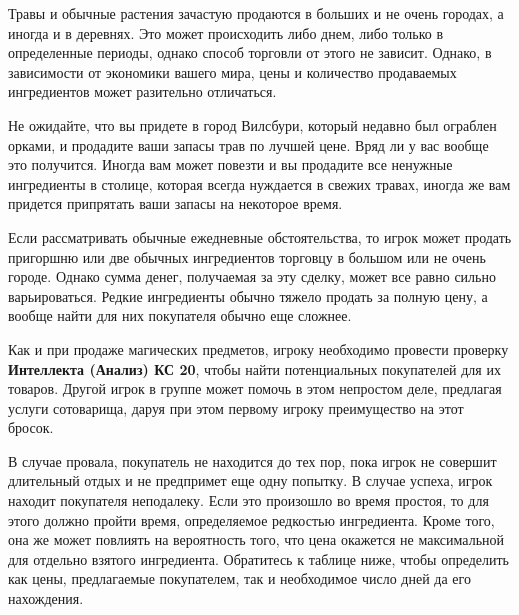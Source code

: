 \documentclass[a4paper, 9pt, twocolumn]{book}
\begin{document}
	Травы и обычные растения зачастую продаются в больших и не очень городах, а иногда и в деревнях. Это может происходить либо днем, либо только в определенные периоды, однако способ торговли от этого не зависит. Однако, в зависимости от экономики вашего мира, цены и количество продаваемых ингредиентов может разительно отличаться.
	
	Не ожидайте, что вы придете в город Вилсбури, который недавно был ограблен орками, и продадите ваши запасы трав по лучшей цене. Вряд ли у вас вообще это получится. Иногда вам может повезти и вы продадите все ненужные ингредиенты в столице, которая всегда нуждается в свежих травах, иногда же вам придется припрятать ваши запасы на некоторое время.
	
	Если рассматривать обычные ежедневные обстоятельства, то игрок может продать пригоршню или две обычных ингредиентов торговцу в большом или не очень городе. Однако сумма денег, получаемая за эту сделку, может все равно сильно варьироваться. Редкие ингредиенты обычно тяжело продать за полную цену, а вообще найти для них покупателя обычно еще сложнее.
	
	Как и при продаже магических предметов, игроку необходимо провести проверку \textbf{Интеллекта (Анализ) КС 20}, чтобы найти потенциальных покупателей для их товаров. Другой игрок в группе может помочь в этом непростом деле, предлагая услуги сотоварища, даруя при этом первому игроку преимущество на этот бросок.
	
	В случае провала, покупатель не находится до тех пор, пока игрок не совершит длительный отдых и не предпримет еще одну попытку. В случае успеха, игрок  находит покупателя неподалеку. Если это произошло во время простоя, то для этого должно пройти время, определяемое  редкостью ингредиента. Кроме того, она же может повлиять на вероятность того, что цена окажется не максимальной для отдельно взятого ингредиента. Обратитесь к таблице ниже, чтобы определить как цены, предлагаемые покупателем, так и необходимое число дней да его нахождения.
	
\end{document}
